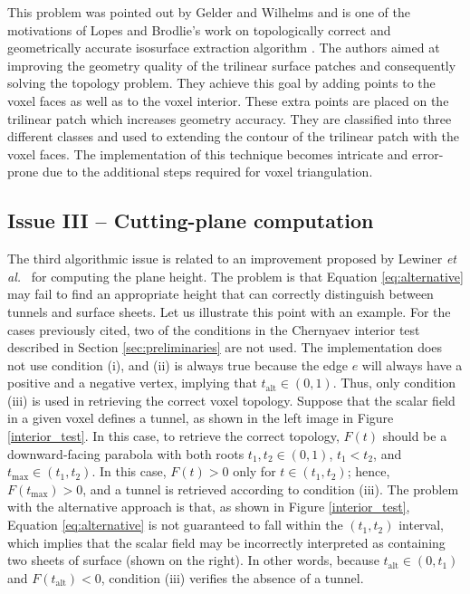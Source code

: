 This problem was pointed out by Gelder and Wilhelms \cite{Gelder94topologicalconsiderations} and is one of the motivations of Lopes and Brodlie's work on topologically correct and geometrically accurate isosurface extraction algorithm \cite{lopes:tvcg:2003}. The authors aimed at improving the geometry quality of the trilinear surface patches and consequently solving the topology problem. They achieve this goal by adding points to the voxel faces as well as to the voxel interior. These extra points are placed on the trilinear patch which increases geometry accuracy. They are classified into three different classes and used to extending the contour of the trilinear patch with the voxel faces. The implementation of this technique becomes intricate and error-prone due to the additional steps required for voxel triangulation. 


\subsection{Issue III -- Cutting-plane computation}

The third algorithmic issue is related to an \mc{} improvement proposed by Lewiner \emph{et al.}~\cite{Lewiner:2003} for computing the plane height.  
The problem is that Equation \eqref{eq:alternative} may fail to find an appropriate height  that can correctly distinguish between tunnels and surface sheets. Let us illustrate this point with an example. For the cases previously cited, two of the conditions in the Chernyaev interior test described in Section \ref{sec:preliminaries} are not used. The \mc{} implementation does not use condition (i), and (ii) is always true because the edge $e$ will always have a positive and a negative vertex, implying that $t_{\mathrm{alt}} \in (0,1)$. Thus, only condition (iii) is used in retrieving the correct voxel topology. Suppose that the scalar field in a given voxel defines a tunnel, as shown in the left image in Figure \ref{interior_test}. In this case, to retrieve the correct topology, $F(t)$ should be a downward-facing parabola with both roots $t_1, t_2 \in (0,1)$, $t_1 < t_2$, and $t_\mathrm{max} \in (t_1,t_2)$. In this case, $F(t) > 0$ only for $t \in (t_1, t_2)$; hence, $F(t_{\mathrm{max}}) > 0$, and a tunnel is retrieved according to condition (iii). The problem with the alternative approach is that, as shown in Figure \ref{interior_test},  Equation \eqref{eq:alternative} is not guaranteed to fall within  the $(t_1,t_2)$ interval, which implies that the scalar field may be incorrectly interpreted as containing two sheets of surface (shown on the right). In other words, because $t_{\mathrm{alt}} \in (0,t_1)$ and $F(t_{\mathrm{alt}}) < 0$, condition (iii) verifies the absence of a tunnel. 

